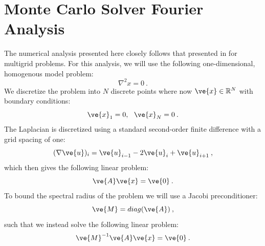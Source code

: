 \documentclass[note]{TechNote}
\begin{document}
\section{Monte Carlo Solver Fourier Analysis}
\label{sec:fourier_analysis}
The numerical analysis presented here closely follows that presented
in \cite{briggs_multigrid} for multigrid problems. For this analysis,
we will use the following one-dimensional, homogenous model problem:
\begin{equation}
  \nabla^2 x = 0\:.
  \label{eq:model_problem}
\end{equation}
We discretize the problem into $N$ discrete points
where now $\ve{x} \in \mathbb{R}^N$ with boundary conditions:
\begin{equation}
  \ve{x}_1 = 0,\ \ \ve{x}_N = 0\:.
  \label{eq:boundary_conditions}
\end{equation}
The Laplacian is discretized using a standard second-order finite
difference with a grid spacing of one:
\begin{equation}
  (\nabla \ve{u})_i = \ve{u}_{i-1} - 2 \ve{u}_{i} + \ve{u}_{i+1}\:,
  \label{eq:discrete_laplacian}
\end{equation}
which then gives the following linear problem:
\begin{equation}
  \ve{A}\ve{x} = \ve{0}\:.
  \label{eq:linear_problem}
\end{equation}
To bound the spectral radius of the problem we will use a Jacobi
preconditioner:
\begin{equation}
  \ve{M} = diag(\ve{A})\:,
  \label{eq:preconditioner}
\end{equation}
such that we instead solve the following linear problem:
\begin{equation}
  \ve{M}^{-1}\ve{A}\ve{x} = \ve{0}\:.
  \label{eq:precond_problem}
\end{equation}
\end{document}
